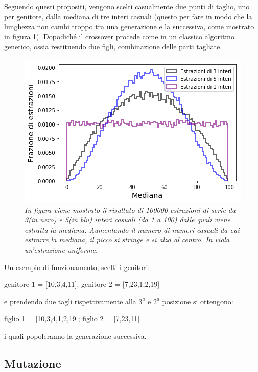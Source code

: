 \documentclass[12pt,a4paper]{report}
\begin{document}
Seguendo questi propositi, vengono scelti casualmente due punti di taglio, uno per genitore, dalla mediana di tre interi casuali (questo per fare in modo che la lunghezza non cambi troppo tra una generazione e la successiva, come mostrato in figura \ref{median}).
Dopodiché il crossover procede come in un classico algoritmo genetico, ossia restituendo due figli, combinazione delle parti tagliate.

\begin{figure}[H]
 \centering
 \includegraphics[scale = 0.7]{images/median-3-5}
 \caption{\textit{In figura viene mostrato il risultato di 100000 estrazioni di serie da 3(in nero) e 5(in blu) interi casuali (da 1 a 100) dalle quali viene estratta la mediana. Aumentando il numero di numeri casuali da cui estrarre la mediana, il picco si stringe e si alza al centro. In viola un'estrazione uniforme.}}
 \label{median}
\end{figure}

Un esempio di funzionamento, scelti i genitori:

\begin{center}
 genitore 1 = [10,3,4,11];  genitore 2 = [7,23,1,2,19]\\
\end{center}

e prendendo due tagli rispettivamente alla $3^{a}$ e $2^{a}$ posizione si ottengono:

\begin{center}
 figlio 1 = [10,3,4,1,2,19]; figlio 2 = [7,23,11]
\end{center}

i quali popoleranno la generazione successiva.

\subsection{Mutazione}
\end{document}
